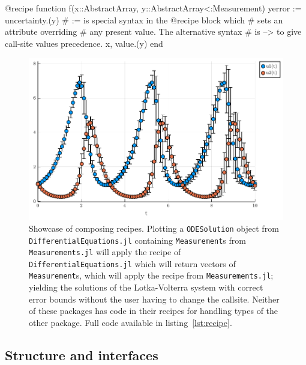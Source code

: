 \documentclass[a4paper]{article}
\begin{document}
\begin{code}[caption={\texttt{Measurements.jl} recipe}, label={lst:measurements}]
@recipe function f(x::AbstractArray, y::AbstractArray{<:Measurement})
    yerror := uncertainty.(y)       # := is special syntax in the @recipe block which
                                    # sets an attribute overriding
                                    # any present value. The alternative syntax
                                    # is --> to give call-site values precedence.
    x, value.(y)
end
\end{code}

\begin{figure}[H]
    \centering
    \includegraphics[width=\textwidth]{./fig/DiffEq_3Measurements.pdf}
    \caption{
        Showcase of composing recipes.
        Plotting a \texttt{ODESolution} object from \texttt{DifferentialEquations.jl} containing \texttt{Measurement}s from \texttt{Measurements.jl} will apply the recipe of \texttt{DifferentialEquations.jl} which will return vectors of \texttt{Measurement}s, which will apply the recipe from \texttt{Measurements.jl}; yielding the solutions of the Lotka-Volterra system\cite{alfredj.lotkaElementsPhysicalBiology1925} with correct error bounds without the user having to change the callsite.
        Neither of these packages has code in their recipes for handling types of the other package.
        Full code available in listing~\ref{lst:recipe}.
    }
    \label{fig:DiffEqM}
\end{figure}


\subsection*{Structure and interfaces}
\end{document}

